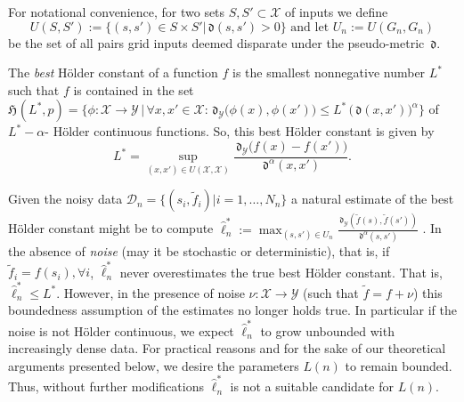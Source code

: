 \documentclass{article} %
\theoremstyle{definition}
\theoremstyle{remark}
\newcommand{\data}{\ensuremath{ \mathcal D} }
\newcommand{\inspace}{\ensuremath{ \mathcal X}}
\newcommand{\outspace}{\ensuremath{ \mathcal Y}}
\newcommand{\grid}{\ensuremath{  G}}
\newcommand{\metric}{\, \mathfrak{d}} %
\newcommand{\noise}{{\nu}} %
\newcommand{\hexp}{{ \alpha }}%
\newcommand{\hoelset}[3]{\mathfrak{H}_{#2}(#1,#3)}
\begin{document}
For notational convenience, for two sets $S,S' \subset \inspace$ of inputs we define  $$U(S,S') := \{(s,s') \in S \times S' | \metric(s,s') >0\} \text{ and  let } U_n := U(\grid_n,\grid_n) $$ be the set of all pairs grid inputs deemed disparate under the pseudo-metric $\metric$.

The \emph{best} H\"older constant of a function $f$ is the smallest nonnegative number $L^*$ such that $f$ is contained in the set 
$\hoelset {L^*}{}{p} = \{\phi: \inspace \to \outspace \, \vert \, \forall x,x' \in \inspace : \metric_\outspace \bigl(\phi(x),\phi(x')\bigr) \leq L^* \, \bigl( \metric (x,x') \bigr)^\hexp\} $ of $L^*-\hexp$- H\"older continuous functions. So, this best H\"older constant is given by  
%
$$L^* = \sup_{(x,x') \in U(\inspace,\inspace)} \frac{\metric_\outspace \bigl(f(x) - f(x')\bigr)}{\metric^\hexp(x,x') }.$$




Given the noisy data $\data_n = \{(s_i,\tilde f_i) | i=1,\ldots,N_n\}$ a natural estimate of the best H\"older constant might be to compute $\hat \ell_n^* := \max_{(s,s') \in U_n} \frac{\metric_\outspace(\tilde f(s),\tilde f(s')) }{\metric^\hexp(s,s')}$ \cite{Strongin1973}. In the absence of \emph{noise} (may it be stochastic or deterministic), that is, if $\tilde f_i = f(s_i),\forall i$, $\hat \ell_n^*$ never overestimates the true best H\"older constant. That is, $\hat \ell_n^* \leq L^*$. However, in the presence of noise $\noise: \inspace \to \outspace$ (such that $\tilde f = f+ \noise$) this boundedness assumption of the estimates no longer holds true. In particular if the noise is not H\"older continuous, we expect $\hat \ell_n^*$ to grow unbounded with increasingly dense data.
For practical reasons and for the sake of our theoretical arguments presented below, we desire the parameters $L(n)$ to remain bounded. Thus, without further modifications $\hat \ell_n^*$ is not a suitable candidate for $L(n)$.
\end{document}
